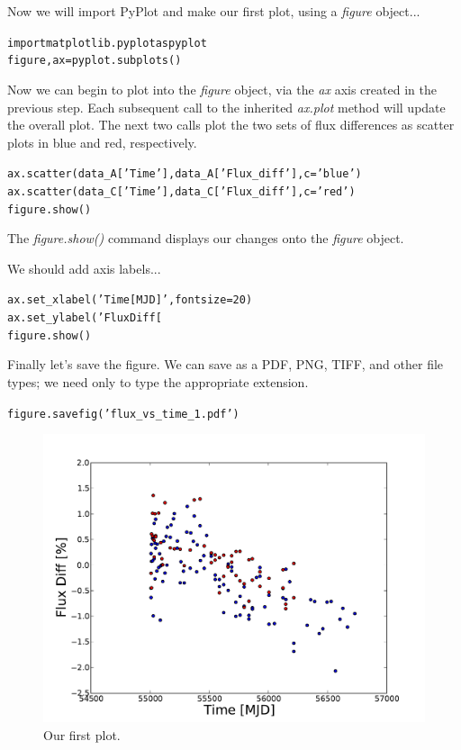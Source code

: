 Now we will import PyPlot and make our first plot, 
using a \textit{figure} object...

\begin{alltt}
\pytab import matplotlib.pyplot as pyplot
\pytab figure, ax = pyplot.subplots()
\end{alltt}

Now we can begin to plot into the \textit{figure} object, via the \textit{ax} 
axis created in the previous step. Each subsequent call to the inherited 
\textit{ax.plot} method will update the overall plot. The next two calls
plot the two sets of flux differences as scatter plots in blue and red,
respectively.

\begin{alltt}
\pytab ax.scatter(data_A['Time'], data_A['Flux_diff'], c='blue')
\pytab ax.scatter(data_C['Time'], data_C['Flux_diff'], c='red')
\pytab figure.show()
\end{alltt}

The \textit{figure.show()} command displays our changes onto the \textit{figure}
object.

We should add axis labels...

\begin{alltt}
\pytab ax.set_xlabel('Time [MJD]', fontsize=20)
\pytab ax.set_ylabel('Flux Diff [%
\pytab figure.show()
\end{alltt}

Finally let's save the figure. We can save as a PDF, PNG, TIFF, and
other file types; we need only to type the appropriate extension.

\begin{alltt}
\pytab figure.savefig('flux_vs_time_1.pdf')
\end{alltt}


\begin{figure}[tbp]
  \centering
    \includegraphics[scale=0.55]{flux_vs_time_1.pdf}
    \caption{Our first plot.}
  \label{fig:flux_vs_time_1}
\end{figure}

